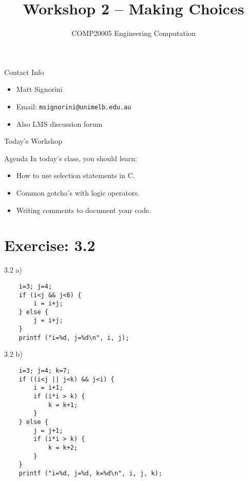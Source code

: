 \documentclass{beamer}
\title{Workshop 2 -- Making Choices}
\author{COMP20005 Engineering Computation}
\institute{The University of Melbourne}
\begin{document}
\begin{frame}
    \titlepage
\end{frame}

\begin{frame}{Contact Info}
    \begin{itemize}
        \item Matt Signorini
        \item Email: \texttt{msignorini@unimelb.edu.au}
        \item Also LMS discussion forum
    \end{itemize}
\end{frame}

\begin{frame}{Today's Workshop}
    \begin{block}{Agenda}
        In today's class, you should learn:
        \begin{itemize}
            \item How to use selection statements in C.
            \item Common gotcha's with logic operators.
            \item Writing comments to document your code.
        \end{itemize}
    \end{block}
\end{frame}

\section{Exercise: 3.2}

\begin{frame}[fragile]{3.2 a)}
    \begin{verbatim}
    i=3; j=4;
    if (i<j && j<6) {
        i = i+j;
    } else {
        j = i+j;
    }
    printf ("i=%d, j=%d\n", i, j);
    \end{verbatim}
\end{frame}

\begin{frame}[fragile]{3.2 b)}
    \begin{verbatim}
    i=3; j=4; k=7;
    if ((i<j || j<k) && j<i) {
        i = i+1;
        if (i*i > k) {
            k = k+1;
        }
    } else {
        j = j+1;
        if (i*i > k) {
            k = k+2;
        }
    }
    printf ("i=%d, j=%d, k=%d\n", i, j, k);
    \end{verbatim}
\end{frame}
\end{document}
